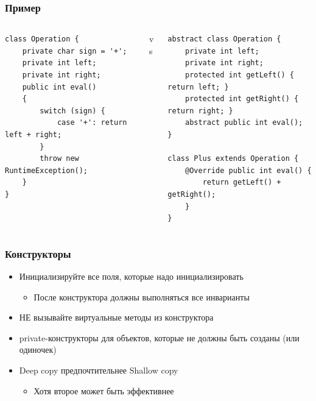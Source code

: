 \documentclass[xetex,mathserif,serif]{beamer}
\begin{document}
	\begin{frame}[fragile]
		\frametitle{Пример}
		\begin{footnotesize}
			\begin{columns}
				\begin{column}{0.35\textwidth}
					\begin{verbatim}
class Operation {
    private char sign = '+';
    private int left;
    private int right;
    public int eval()
    {
        switch (sign) {
            case '+': return left + right;
        }
        throw new RuntimeException();
    }
}
					\end{verbatim}
				\end{column}
				\begin{column}{0.1\textwidth}
					vs
				\end{column}
				\begin{column}{0.45\textwidth}
					\begin{verbatim}
abstract class Operation {
    private int left;
    private int right;
    protected int getLeft() { return left; }
    protected int getRight() { return right; }
    abstract public int eval();
}

class Plus extends Operation {
    @Override public int eval() { 
        return getLeft() + getRight(); 
    }
}
					\end{verbatim}
				\end{column}
			\end{columns}
		\end{footnotesize}
	\end{frame}

	\begin{frame}
		\frametitle{Конструкторы}
		\begin{itemize}
			\item Инициализируйте все поля, которые надо инициализировать
			\begin{itemize}
				\item После конструктора должны выполняться все инварианты
			\end{itemize}
			\item НЕ вызывайте виртуальные методы из конструктора
			\item private-конструкторы для объектов, которые не должны быть созданы (или одиночек)
			\item Deep copy предпочтительнее Shallow copy
			\begin{itemize}
				\item Хотя второе может быть эффективнее
			\end{itemize}
		\end{itemize}
	\end{frame}
\end{document}
